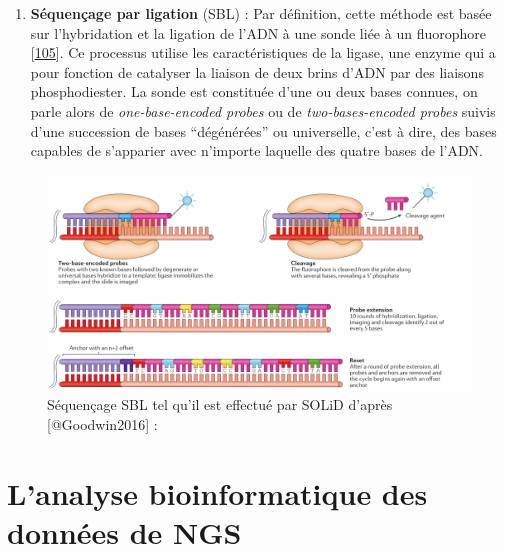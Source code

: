 \documentclass[12pt,twoside]{reedthesis}
\providecommand{\tightlist}{%
  \setlength{\itemsep}{0pt}\setlength{\parskip}{0pt}}
\theoremstyle{definition}
\theoremstyle{definition}
\theoremstyle{remark}
\begin{document}
  \newpage
  
  \begin{enumerate}
  \def\labelenumi{\arabic{enumi}.}
  \setcounter{enumi}{1}
  \tightlist
  \item
    \textbf{Séquençage par ligation} (SBL) : Par définition, cette méthode
    est basée sur l'hybridation et la ligation de l'ADN à une sonde liée à
    un fluorophore {[}\protect\hyperlink{ref-Tomkinson2006}{105}{]}. Ce
    processus utilise les caractéristiques de la ligase, une enzyme qui a
    pour fonction de catalyser la liaison de deux brins d'ADN par des
    liaisons phosphodiester. La sonde est constituée d'une ou deux bases
    connues, on parle alors de \emph{one-base-encoded probes} ou de
    \emph{two-bases-encoded probes} suivis d'une succession de bases
    ``dégénérées'' ou universelle, c'est à dire, des bases capables de
    s'apparier avec n'importe laquelle des quatre bases de l'ADN.
  \end{enumerate}
  
  \begin{figure}
  
  {\centering \includegraphics[scale=.26]{figure/SBL_seq_solid} 
  
  }
  
  \caption[Séquençage SBL tel qu'il est effectué par SOLiD]{Séquençage SBL tel qu'il est effectué par SOLiD d'après [@Goodwin2016] : }\label{fig:sblSeq}
  \end{figure}
  
  \newpage  
  
  \section{L'analyse bioinformatique des données de
  NGS}\label{lanalyse-bioinformatique-des-donnees-de-ngs}
  
\end{document}
